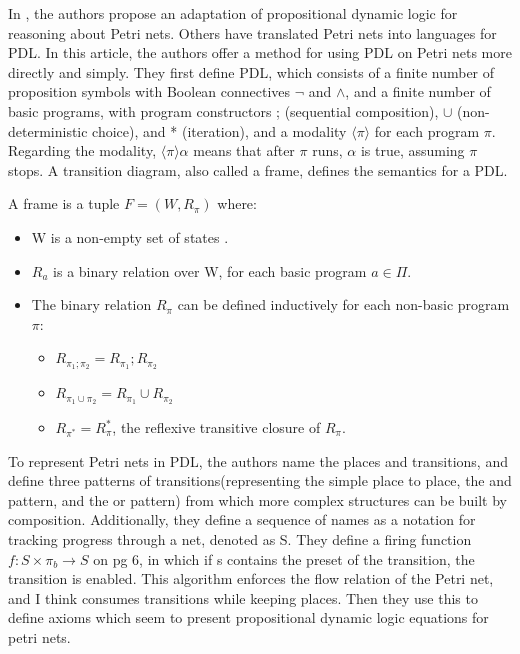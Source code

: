  In \cite{doi:10.1093/jigpal/jzu010}, the authors propose an adaptation of propositional dynamic logic for reasoning about Petri nets. Others have translated Petri nets into languages for PDL. In this article, the authors offer a method for using PDL on Petri nets more directly and simply. They first define PDL, which consists of a finite number of proposition symbols with Boolean connectives $\neg$ and $\wedge$, and a finite number of basic programs, with program constructors ; (sequential composition), $\cup$ (non-deterministic choice), and * (iteration), and a modality $\langle \pi \rangle$ for each program $\pi$. Regarding the modality, $\langle \pi \rangle \alpha$ means that after $\pi$ runs, $\alpha$ is true, assuming $\pi$ stops. A transition diagram, also called a frame, defines the semantics for a PDL. 
\begin{definition}
\label {PDL-frame} A frame is a tuple $F=(W, R_\pi)$ where:
\begin{itemize}
\item W is a non-empty set of states .
\item $R_a$ is a binary relation over W, for each basic program $a \in \Pi$.
\item The binary relation $R_\pi$ can be defined inductively for each non-basic program $\pi$:
\begin{itemize}
\item $R_{\pi_1;\pi_2} = R_{\pi_1} ; R_{\pi_2}$
\item $R_{\pi_1\cup\pi_2} = R_{\pi_1} \cup R_{\pi_2}$
\item $R_{\pi^*}=R_\pi^*$, the reflexive transitive closure of $R_\pi$.
\end{itemize}
\end{itemize}
\end{definition}
To represent Petri nets in PDL, the authors name the places and transitions, and define three patterns of transitions(representing the simple place to place, the and pattern, and the or pattern) from which more complex structures can be built by composition. Additionally, they define a sequence of names as a notation for tracking progress through a net, denoted as S. They define a firing function $f: S \times \pi_b \rightarrow S$ on pg 6, in which if s contains the preset of the transition, the transition is enabled. This algorithm enforces the flow relation of the Petri net, and I think consumes transitions while keeping places. Then they use this to define axioms which seem to present propositional dynamic logic equations for petri nets. 
\cite{LOPES201467} 